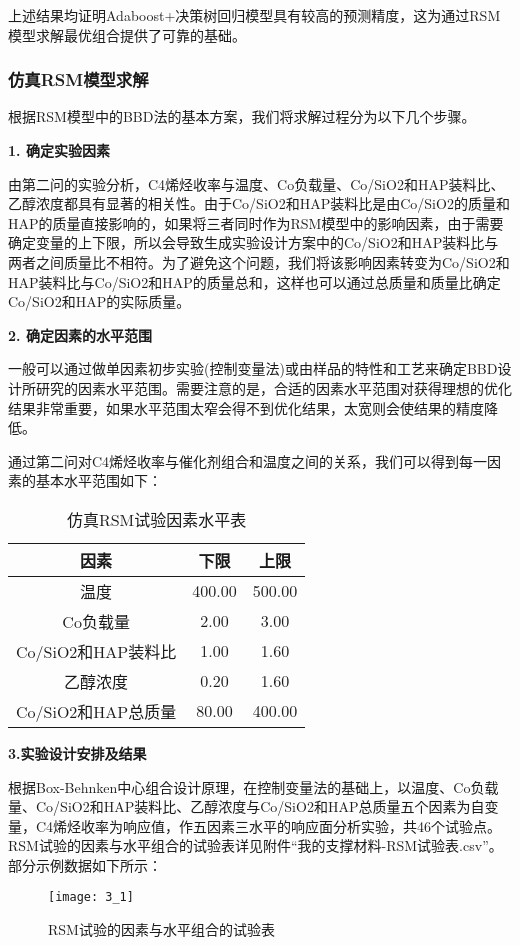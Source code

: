 \documentclass[withoutpreface,bwprint]{cumcmthesis} %
\begin{document}
上述结果均证明Adaboost+决策树回归模型具有较高的预测精度，这为通过RSM模型求解最优组合提供了可靠的基础。


\subsubsection{仿真RSM模型求解}
根据RSM模型中的BBD法的基本方案，我们将求解过程分为以下几个步骤。

\textbf{1. 确定实验因素}

由第二问的实验分析，C4烯烃收率与温度、Co负载量、Co/SiO2和HAP装料比、乙醇浓度都具有显著的相关性。由于Co/SiO2和HAP装料比是由Co/SiO2的质量和HAP的质量直接影响的，如果将三者同时作为RSM模型中的影响因素，由于需要确定变量的上下限，所以会导致生成实验设计方案中的Co/SiO2和HAP装料比与两者之间质量比不相符。为了避免这个问题，我们将该影响因素转变为Co/SiO2和HAP装料比与Co/SiO2和HAP的质量总和，这样也可以通过总质量和质量比确定Co/SiO2和HAP的实际质量。

\textbf{2. 确定因素的水平范围}

一般可以通过做单因素初步实验(控制变量法)或由样品的特性和工艺来确定BBD设计所研究的因素水平范围。需要注意的是，合适的因素水平范围对获得理想的优化结果非常重要，如果水平范围太窄会得不到优化结果，太宽则会使结果的精度降低。

通过第二问对C4烯烃收率与催化剂组合和温度之间的关系，我们可以得到每一因素的基本水平范围如下：

\begin{table}[!htbp]
	\caption{仿真RSM试验因素水平表}\label{tab:001} \centering
	\begin{tabular}{ccc}
		\toprule[1.5pt]
		因素& 下限 & 上限 \\
		\midrule[1pt]
		温度 &  400.00 & 500.00 \\
		Co负载量 &  2.00 & 3.00 \\
		Co/SiO2和HAP装料比 &  1.00 & 1.60 \\
		乙醇浓度 &  0.20 & 1.60 \\
		Co/SiO2和HAP总质量 &  80.00 &  400.00\\
		\bottomrule[1.5pt]	
	\end{tabular}
\end{table}


\textbf{3.实验设计安排及结果}

根据Box-Behnken中心组合设计原理，在控制变量法的基础上，以温度、Co负载量、Co/SiO2和HAP装料比、乙醇浓度与Co/SiO2和HAP总质量五个因素为自变量，C4烯烃收率为响应值，作五因素三水平的响应面分析实验，共46个试验点。RSM试验的因素与水平组合的试验表详见附件“我的支撑材料-RSM试验表.csv”。部分示例数据如下所示：
\begin{figure}[!h]
	\centering
	\texttt{[image: 3\_1]}
	\caption{RSM试验的因素与水平组合的试验表}
	\label{fig:circuit-diagram1}
\end{figure}
\end{document}
